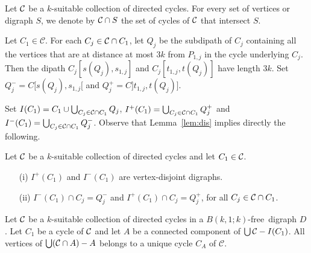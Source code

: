 \documentclass{endm}
\begin{document}
 
 
 
 
 

Let ${\cal C}$ be a $k$-suitable collection of directed cycles.
For every set of vertices or digraph $S$, we denote by ${\cal C}\cap S$ the set of cycles of ${\cal C}$ that intersect $S$. 



Let $C_1\in \mathcal{C}$.
For each $C_j\in {\cal C} \cap C_1$, let $Q_j$ be the subdipath of $C_j$ 
containing all the vertices that are at distance at most $3k$ from $P_{1,j}$ in the cycle underlying $C_j$.
Then the dipath $C_j[s(Q_j), s_{1,j}]$ and  $C_j[t_{1,j},t (Q_j)]$ have length $3k$.
Set $Q^-_j=C[s(Q_j), s_{1,j}[$ and $Q^+_j=C]t_{1,j}, t(Q_j)]$.


Set  $I(C_1) =C_1\cup \bigcup_{C_j\in {\cal C}\cap C_1} Q_j$, $I^+(C_1) = \bigcup_{C_j\in {\cal C}\cap C_1} Q^+_j$ and $I^-(C_1) = \bigcup_{C_j\in {\cal C}\cap C_1} Q^-_j$.
Observe that Lemma~\ref{lem:dis} implies directly the following.
\begin{corollary}\label{cor:util}
Let ${\cal C}$ be a $k$-suitable collection of directed cycles and let $C_1\in {\cal C}$.
\begin{itemize}
\item[(i)]  $I^+(C_1)$ and $I^-(C_1)$ are vertex-disjoint digraphs. 
\item[(ii)] $I^-(C_1) \cap C_j = Q^-_j$ and $I^+(C_1) \cap C_j = Q^+_j$, for all $C_j\in {\cal C}\cap C_1$.
\end{itemize}
 \end{corollary}



\begin{lemma}\label{lem:A}
Let ${\cal C}$ be a $k$-suitable collection of directed cycles in a $B(k,1;k)$-free\ digraph $D$.
Let $C_1$ be a cycle of ${\cal C}$ and let $A$ be a connected component of $\bigcup{\cal C} - I(C_1)$.
All vertices of $\bigcup({\cal C}\cap A)  - A$ belongs to a unique cycle $C_A$ of $\mathcal{C}$.
\end{lemma}
\end{document}
